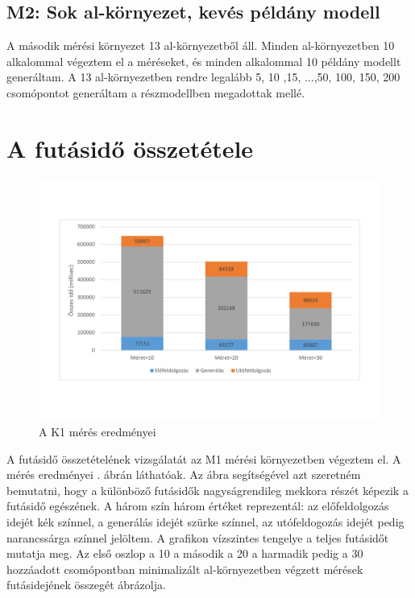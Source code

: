 \subsection{M2: Sok al-környezet, kevés példány modell} 
A második mérési környezet 13 al-környezetből áll. Minden al-környezetben 10  alkalommal végeztem el a méréseket, és minden alkalommal 10 példány modellt generáltam. A 13  al-környezetben rendre legalább 5, 10 ,15, ...,50, 100, 150, 200 csomópontot generáltam a részmodellben megadottak mellé.

\section{A futásidő összetétele}

\begin{figure}
	\centering
	\includegraphics[width=1\textwidth]{figures/aránygrafikontáblázathelyett}
	\caption{A K1 mérés eredményei}
	\label{fig:grafikon}
\end{figure}

A futásidő összetételének vizsgálatát az M1 mérési környezetben végeztem el. A mérés eredményei  . ábrán láthatóak. Az ábra segítségével azt szeretném bemutatni, hogy a különböző futásidők nagyságrendileg mekkora részét képezik a futásidő egészének. A három szín három értéket reprezentál: az előfeldolgozás idejét kék színnel, a generálás idejét szürke színnel, az utófeldogozás idejét pedig narancssárga színnel jelöltem. A grafikon vízszintes tengelye a teljes futásidőt mutatja meg. Az első oszlop a 10 a második a 20 a harmadik pedig a 30 hozzáadott csomópontban minimalizált al-környezetben végzett mérések futásidejének összegét ábrázolja. 

